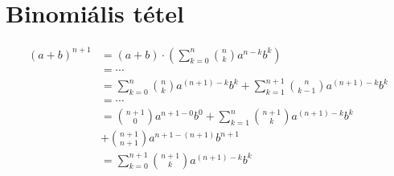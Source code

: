 \documentclass{article}
\begin{document}
    \newpage
    \section{Binomiális tétel}
        \begin{subequations}
            \begin{align}
            (a+b)^{n+1}
                &= (a+b) \cdot \left( \sum_{k=0}^n \binom{n}{k} a^{n-k}b^k \right)\\
                &=\cdots\\
                &= \sum_{k=0}^n \binom{n}{k} a^{(n+1)-k}b^k + \sum_{k=1}^{n+1} \binom{n}{k-1} a^{(n+1)-k}b^{k}\\
                &= \cdots\\
                &= \binom{n+1}{0} a^{n+1-0} b^0 + \sum_{k=1}^n \binom{n+1}{k} a^{(n+1)-k}b^k\\
                &+ \binom{n+1}{n+1} a^{n+1-(n+1)} b^{n+1}\\
                &= \sum_{k=0}^{n+1} \binom{n+1}{k} a^{(n+1)-k}b^k
            \end{align}
        \end{subequations}
\end{document}
